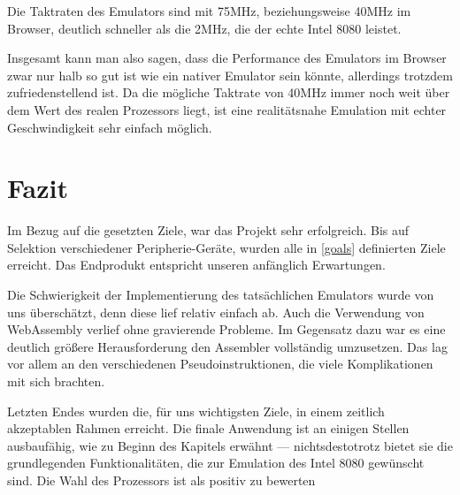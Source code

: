 Die Taktraten des Emulators sind mit 75MHz, beziehungsweise 40MHz im Browser, deutlich schneller als die 2MHz, die der echte Intel 8080 leistet.

Insgesamt kann man also sagen, dass die Performance des Emulators im Browser zwar nur halb so gut ist wie ein nativer Emulator sein könnte, allerdings trotzdem zufriedenstellend ist. Da die mögliche Taktrate von 40MHz immer noch weit über dem Wert des realen Prozessors liegt, ist eine realitätsnahe Emulation mit echter Geschwindigkeit sehr einfach möglich.

\section{Fazit}

Im Bezug auf die gesetzten Ziele, war das Projekt sehr erfolgreich. Bis auf Selektion verschiedener Peripherie-Geräte, wurden alle in \cref{goals} definierten Ziele erreicht. Das Endprodukt entspricht unseren anfänglich Erwartungen.

Die Schwierigkeit der Implementierung des tatsächlichen Emulators wurde von uns überschätzt, denn diese lief relativ einfach ab. Auch die Verwendung von WebAssembly verlief ohne gravierende Probleme. Im Gegensatz dazu war es eine deutlich größere Herausforderung den Assembler vollständig umzusetzen. Das lag vor allem an den verschiedenen Pseudoinstruktionen, die viele Komplikationen mit sich brachten.

Letzten Endes wurden die, für uns wichtigsten Ziele, in einem zeitlich akzeptablen Rahmen erreicht. Die finale Anwendung ist an einigen Stellen ausbaufähig, wie zu Beginn des Kapitels erwähnt --- nichtsdestotrotz bietet sie die grundlegenden Funktionalitäten, die zur Emulation des Intel 8080 gewünscht sind. Die Wahl des Prozessors ist als positiv zu bewerten
